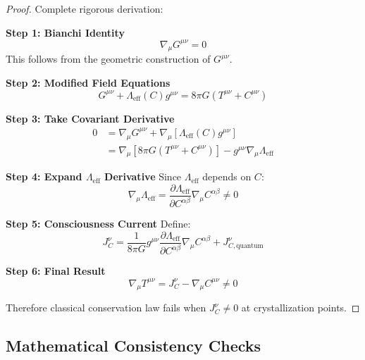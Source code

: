 \documentclass[11pt]{article}
\theoremstyle{definition}
\begin{document}
\begin{proof}
Complete rigorous derivation:

\textbf{Step 1: Bianchi Identity}
\begin{equation}
\nabla_\mu G^{\mu\nu} = 0
\end{equation}
This follows from the geometric construction of $G^{\mu\nu}$.

\textbf{Step 2: Modified Field Equations}
\begin{equation}
G^{\mu\nu} + \Lambda_{\text{eff}}(C)g^{\mu\nu} = 8\pi G(T^{\mu\nu} + C^{\mu\nu})
\end{equation}

\textbf{Step 3: Take Covariant Derivative}
\begin{align}
0 &= \nabla_\mu G^{\mu\nu} + \nabla_\mu[\Lambda_{\text{eff}}(C)g^{\mu\nu}]\\
&= \nabla_\mu[8\pi G(T^{\mu\nu} + C^{\mu\nu})] - g^{\mu\nu}\nabla_\mu\Lambda_{\text{eff}}
\end{align}

\textbf{Step 4: Expand $\Lambda_{\text{eff}}$ Derivative}
Since $\Lambda_{\text{eff}}$ depends on $C$:
\begin{equation}
\nabla_\mu\Lambda_{\text{eff}} = \frac{\partial\Lambda_{\text{eff}}}{\partial C^{\alpha\beta}}\nabla_\mu C^{\alpha\beta} \neq 0
\end{equation}

\textbf{Step 5: Consciousness Current}
Define:
\begin{equation}
J^\nu_C = \frac{1}{8\pi G}g^{\mu\nu}\frac{\partial\Lambda_{\text{eff}}}{\partial C^{\alpha\beta}}\nabla_\mu C^{\alpha\beta} + J^\nu_{C,\text{quantum}}
\end{equation}

\textbf{Step 6: Final Result}
\begin{equation}
\nabla_\mu T^{\mu\nu} = J^\nu_C - \nabla_\mu C^{\mu\nu} \neq 0
\end{equation}

Therefore classical conservation law fails when $J^\nu_C \neq 0$ at crystallization points.
\end{proof}

\subsection{Mathematical Consistency Checks}
\end{document}
